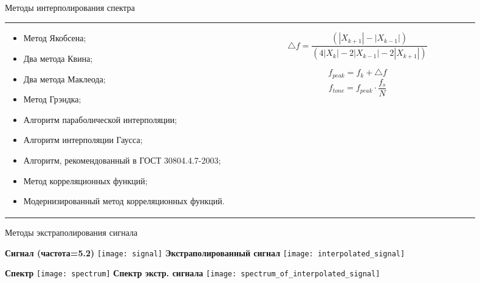 \begin{frame}{Методы интерполирования спектра}
\begin{tabular}{m{0.45\linewidth}m{0.45\linewidth}}
\small{
\begin{itemize}	
	\item Метод Якобсена;
	\item Два метода Квина;
	\item Два метода Маклеода;
	\item Метод Грэндка;
	\item Алгоритм параболической интерполяции;
	\item Алгоритм интерполяции Гаусса;
	\item Алгоритм, рекомендованный в ГОСТ 30804.4.7-2003;
	\item Метод корреляционных функций;
	\item Модернизированный метод корреляционных функций.				
\end{itemize}}
&	
\begin{equation}
	\label{eq:equation2}
	\bigtriangleup f = \frac{(|X_{k+1}|-|X_{k-1}|)}{(4|X_{k}|-2|X_{k-1}|-2|X_{k+1}|)}
\end{equation}

\begin{equation}
	\label{eq:equation7}
	f_{peak} = f_k + \bigtriangleup f
\end{equation}
\begin{equation}
	\label{eq:equation8}
	f_{tone} = f_{peak} \cdot \frac{f_s}{N}
\end{equation}
\end{tabular}
\end{frame}

\begin{frame}{Методы экстраполирования сигнала}
	\begin{minipage}[t]{0.45\linewidth}
		\centering 
		\textbf{Сигнал (частота=5.2)}
		\texttt{[image: signal]}
		\textbf{Экстраполированный сигнал }
		\texttt{[image: interpolated\_signal]}		
	\end{minipage}
	\hfill
	\begin{minipage}[t]{0.45\linewidth}
		\centering 
		\textbf{Спектр}
		\texttt{[image: spectrum]}
		\textbf{Спектр экстр. сигнала}
		\texttt{[image: spectrum\_of\_interpolated\_signal]}
	\end{minipage}
\end{frame}

